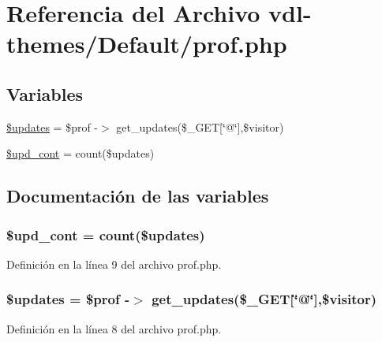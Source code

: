 \hypertarget{prof_8php}{\section{Referencia del Archivo vdl-\/themes/\-Default/prof.php}
\label{prof_8php}
}
\subsection*{Variables}
\begin{DoxyCompactItemize}
\item 
\hyperlink{prof_8php_ae1137d4abf74238458bcf9f92b74f8bc}{\$updates} = \$prof -\/$>$ get\-\_\-updates(\$\-\_\-\-G\-E\-T\mbox{[}\char`\"{}@\char`\"{}\mbox{]},\$visitor)
\item 
\hyperlink{prof_8php_a3a439a15605194913fa6956129cc3e2d}{\$upd\-\_\-cont} = count(\$updates)
\end{DoxyCompactItemize}


\subsection{Documentación de las variables}
\hypertarget{prof_8php_a3a439a15605194913fa6956129cc3e2d}{
\subsubsection[{\$upd\-\_\-cont}]{\setlength{\rightskip}{0pt plus 5cm}\$upd\-\_\-cont = count(\$updates)}}\label{prof_8php_a3a439a15605194913fa6956129cc3e2d}


Definición en la línea 9 del archivo prof.\-php.

\hypertarget{prof_8php_ae1137d4abf74238458bcf9f92b74f8bc}{
\subsubsection[{\$updates}]{\setlength{\rightskip}{0pt plus 5cm}\$updates = \$prof -\/$>$ get\-\_\-updates(\$\-\_\-\-G\-E\-T\mbox{[}\char`\"{}@\char`\"{}\mbox{]},\$visitor)}}\label{prof_8php_ae1137d4abf74238458bcf9f92b74f8bc}


Definición en la línea 8 del archivo prof.\-php.

